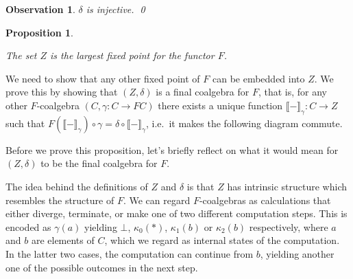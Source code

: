 \documentclass[a4paper]{article}
\newcommand{\arr}{\rightarrow}
\newcommand{\semantics}[1]{\llbracket #1 \rrbracket}
\newtheorem{obsNuFCoalgebraIsInjective}[defNuF]{Observation}
\newtheorem{thmDomNuFisFinal}[defNuF]{Proposition}
\begin{document}
\begin{obsNuFCoalgebraIsInjective}
$\delta$ is injective. \qed
\end{obsNuFCoalgebraIsInjective}

\begin{thmDomNuFisFinal}
\label{thmDomNuFisFinal}

The set $Z$ is the largest fixed point for the functor $F$.

\end{thmDomNuFisFinal}

We need to show that any other fixed point of $F$ can be embedded into $Z$.  We
prove this by showing that $(Z, \delta)$ is a final coalgebra for $F$, that is,
for any other $F$-coalgebra $(C, \gamma : C \arr FC)$ there exists a unique
function $\semantics{-}_{\gamma} : C \arr Z$ such that
$F(\semantics{-}_{\gamma}) \circ \gamma = \delta \circ \semantics{-}_{\gamma}$,
i.e.~it makes the following diagram commute.

\begin{figure}[h]
\begin{center}
\end{center}
\end{figure}

Before we prove this proposition, let's briefly reflect on what it would mean
for $(Z, \delta)$ to be the final coalgebra for $F$.

The idea behind the definitions of $Z$ and $\delta$ is that $Z$ has intrinsic
structure which resembles the structure of $F$.  We can regard $F$-coalgebras as
calculations that either diverge, terminate, or make one of two different
computation steps.  This is encoded as $\gamma(a)$ yielding $\bot$,
$\kappa_0(*)$, $\kappa_1(b)$ or $\kappa_2(b)$ respectively, where $a$ and $b$
are elements of $C$, which we regard as internal states of the computation. In
the latter two cases, the computation can continue from $b$, yielding another
one of the possible outcomes in the next step.
\end{document}

